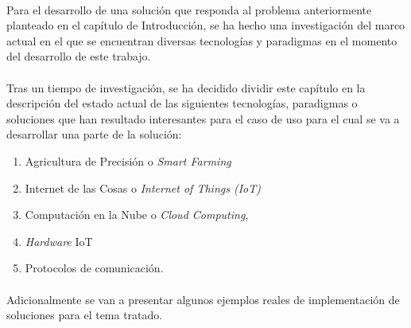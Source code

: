 \documentclass[../../memoria.tex]{subfiles}
\begin{document}
\paragraph{}
Para el desarrollo de una solución que responda al problema anteriormente planteado en el capítulo de Introducción, se ha hecho una investigación del marco actual en el que se encuentran diversas tecnologías y paradigmas en el momento del desarrollo de este trabajo.

\paragraph{}
Tras un tiempo de investigación, se ha decidido dividir este capítulo en la descripción del estado actual de las siguientes tecnologías, paradigmas o soluciones que han resultado interesantes para el caso de uso para el cual se va a desarrollar una parte de la solución:

\begin{enumerate}
    \item Agricultura de Precisión o \textit{Smart Farming}
    \item Internet de las Cosas o \textit{Internet of Things (IoT)}
    \item Computación en la Nube o \textit{Cloud Computing},
    \item \textit{Hardware} IoT
    \item Protocolos de comunicación.
\end{enumerate}

\paragraph{}
Adicionalmente se van a presentar algunos ejemplos reales de implementación de soluciones para el tema tratado.
\end{document}
